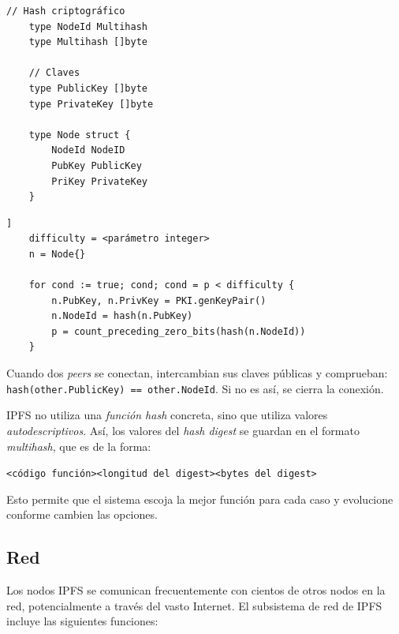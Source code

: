\documentclass[12pt]{article} %
\begin{document}
\begin{lstlisting}[caption={Definición de Nodo.}, language=Golang]
	// Hash criptográfico
	type NodeId Multihash
	type Multihash []byte
	
	// Claves
	type PublicKey []byte
	type PrivateKey []byte

	type Node struct {
		NodeId NodeID
		PubKey PublicKey
		PriKey PrivateKey
	}
\end{lstlisting}

\begin{lstlisting}[caption={Generación de identidad con S/Kamdelia.}, language=Golang]]
	difficulty = <parámetro integer>
	n = Node{}

	for cond := true; cond; cond = p < difficulty {
		n.PubKey, n.PrivKey = PKI.genKeyPair()
		n.NodeId = hash(n.PubKey)
		p = count_preceding_zero_bits(hash(n.NodeId))
	}
\end{lstlisting}

Cuando dos \textit{peers} se conectan, intercambian sus claves públicas y comprueban: \texttt{hash(other.PublicKey) == other.NodeId}. Si no es así, se cierra la conexión.

IPFS no utiliza una \textit{función hash} concreta, sino que utiliza valores \textit{autodescriptivos}. Así, los valores del \textit{hash digest} se guardan en el formato \textit{multihash}, que es de la forma:\\ 

\centerline{\texttt{<código función><longitud del digest><bytes del digest>}} 

Esto permite que el sistema escoja la mejor función para cada caso y evolucione conforme cambien las opciones.


\subsection{Red} %
\label{sub:red}

Los nodos IPFS se comunican frecuentemente con cientos de otros nodos en la red, potencialmente a través del vasto Internet. El subsistema de red de IPFS incluye las siguientes funciones:
\end{document}

